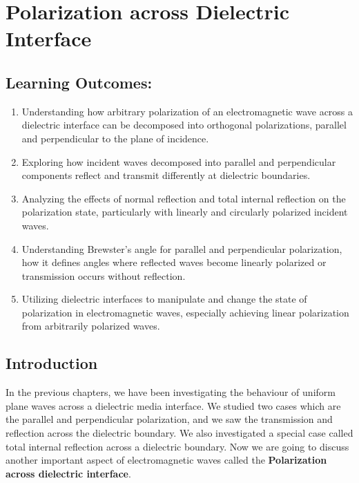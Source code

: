 \chapter{Polarization across Dielectric Interface}\label{lec:lec33}

\section{Learning Outcomes:}
\begin{mdframed}[backgroundcolor=lightblue, linewidth=1pt, hidealllines=true]
    \begin{enumerate}[label=\roman*., itemsep=0pt, topsep=0pt]
        \item Understanding how arbitrary polarization of an electromagnetic wave across a dielectric interface can be decomposed into orthogonal polarizations, parallel and perpendicular to the plane of incidence.
        \item Exploring how incident waves decomposed into parallel and perpendicular components reflect and transmit differently at dielectric boundaries.
        \item Analyzing the effects of normal reflection and total internal reflection on the polarization state, particularly with linearly and circularly polarized incident waves.
        \item Understanding Brewster's angle for parallel and perpendicular polarization, how it defines angles where reflected waves become linearly polarized or transmission occurs without reflection.
        \item Utilizing dielectric interfaces to manipulate and change the state of polarization in electromagnetic waves, especially achieving linear polarization from arbitrarily polarized waves.
    \end{enumerate}
\end{mdframed}

\section{Introduction}

In the previous chapters, we have been investigating the behaviour of uniform plane waves across a dielectric media interface. We studied two cases which are the parallel and perpendicular polarization, and we saw the transmission and reflection across the dielectric boundary. We also investigated a special case called total internal reflection across a dielectric boundary. Now we are going to discuss another important aspect of electromagnetic waves called the \textbf{Polarization across dielectric interface}. 

